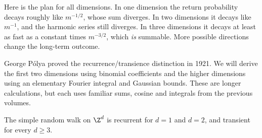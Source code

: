 Here is the plan for all dimensions. In one dimension the return probability decays roughly like $m^{-1/2}$, whose sum diverges. In two dimensions it decays like $m^{-1}$, and the harmonic series still diverges. In three dimensions it decays at least as fast as a constant times $m^{-3/2}$, which \emph{is} summable. More possible directions change the long-term outcome.

George P\'olya proved the recurrence/transience distinction in 1921. We will derive the first two dimensions using binomial coefficients and the higher dimensions using an elementary Fourier integral and Gaussian bounds. These are longer calculations, but each uses familiar sums, cosine and integrals from the previous volumes.

\begin{theorem}[P\'olya]\label{thm:polya}
The simple random walk on $\Z^d$ is recurrent for $d=1$ and $d=2$, and transient for every $d\ge3$.
\end{theorem}
